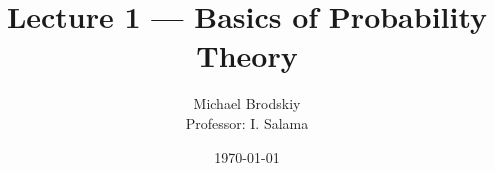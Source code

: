 


\title{Lecture 1 — Basics of Probability Theory}
\date{\today}
\author{Michael Brodskiy\\ \small Professor: I. Salama}



\maketitle

